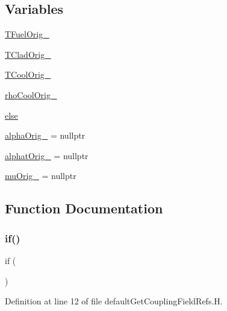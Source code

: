 \subsection*{Variables}
\begin{DoxyCompactItemize}
\item 
\hyperlink{defaultGetCouplingFieldRefs_8H_af402ab4d8e2e8152ef35ec58ecf63a2a}{T\+Fuel\+Orig\+\_\+}
\item 
\hyperlink{defaultGetCouplingFieldRefs_8H_a73c38fe5cf4a4b0eba8741ffd6a846c9}{T\+Clad\+Orig\+\_\+}
\item 
\hyperlink{defaultGetCouplingFieldRefs_8H_a8b3539e1efe24d56494f4cb35c5b87cb}{T\+Cool\+Orig\+\_\+}
\item 
\hyperlink{defaultGetCouplingFieldRefs_8H_aa1afae7bd76c1676b35d4036c3b50043}{rho\+Cool\+Orig\+\_\+}
\item 
\hyperlink{defaultGetCouplingFieldRefs_8H_a0544c3fe466e421738dae463968b70ba}{else}
\item 
\hyperlink{defaultGetCouplingFieldRefs_8H_a52d5cbed6e511685761cd5c7db8f402f}{alpha\+Orig\+\_\+} = nullptr
\item 
\hyperlink{defaultGetCouplingFieldRefs_8H_a717cea0147966559627ce01af1522331}{alphat\+Orig\+\_\+} = nullptr
\item 
\hyperlink{defaultGetCouplingFieldRefs_8H_ace5c6d916116c439b30ff3c9311eac1e}{mu\+Orig\+\_\+} = nullptr
\end{DoxyCompactItemize}


\subsection{Function Documentation}
\mbox{\label{defaultGetCouplingFieldRefs_8H_af8bc169eba905485123c31c252bf9b5c}} 
\subsubsection{\texorpdfstring{if()}{if()}}
{\footnotesize\ttfamily if (\begin{DoxyParamCaption}\item[{liquid\+Fuel\+\_\+}]{ }\end{DoxyParamCaption})}



Definition at line 12 of file default\+Get\+Coupling\+Field\+Refs.\+H.



